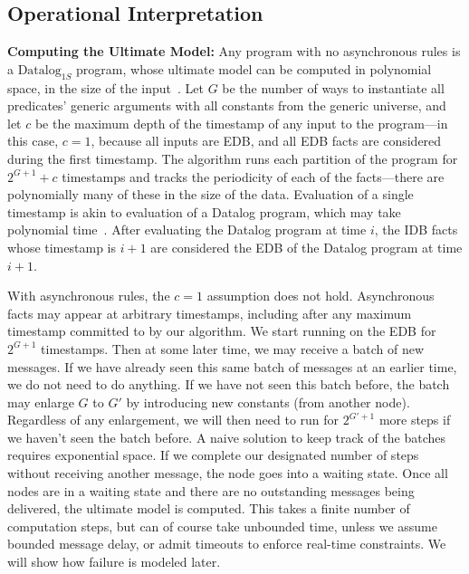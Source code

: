 \subsection{Operational Interpretation}

\vspace{1em}
{\bf Computing the Ultimate Model:}
Any \lang program with no asynchronous rules is a $\text{Datalog}_{1S}$ program, whose ultimate model can be computed in polynomial space, in the size of the input~\cite{tdd}. 
Let $G$ be the number of ways to instantiate all predicates' generic arguments with all constants from the generic universe, and let $c$ be the maximum depth of the timestamp of any input to the program---in this case, $c=1$, because all inputs are EDB, and all EDB facts are considered during the first timestamp.  The algorithm runs each partition of the program for $2^{G+1} + c$ timestamps and tracks the periodicity of each of the facts---there are polynomially many of these in the size of the data.  Evaluation of a single timestamp is akin to evaluation of a Datalog program, which may take polynomial time~\cite{immerman-ptime, vardi-ptime}.  After evaluating the Datalog program at time $i$, the IDB facts whose timestamp is $i+1$ are considered the EDB of the Datalog program at time $i+1$.


With asynchronous rules, the $c=1$ assumption does not hold.  Asynchronous facts may appear at arbitrary timestamps, including after any maximum timestamp committed to by our algorithm.  We start running on the EDB for $2^{G+1}$ timestamps.  Then at some later time, we may receive a batch of new messages.  If we have already seen this same batch of messages at an earlier time, we do not need to do anything.  If we have not seen this batch before, the batch may enlarge $G$ to $G'$ by introducing new constants (from another node).  Regardless of any enlargement, we will then need to run for $2^{G'+1}$ more steps if we haven't seen the batch before.  A naive solution to keep track of the batches requires exponential space.  If we complete our designated number of steps without receiving another message, the node goes into a waiting state.  Once all nodes are in a waiting state and there are no outstanding messages being delivered, the ultimate model is computed.  This takes a finite number of computation steps, but can of course take unbounded time, unless we assume bounded message delay, or admit timeouts to enforce real-time constraints.  We will show how failure is modeled later.


